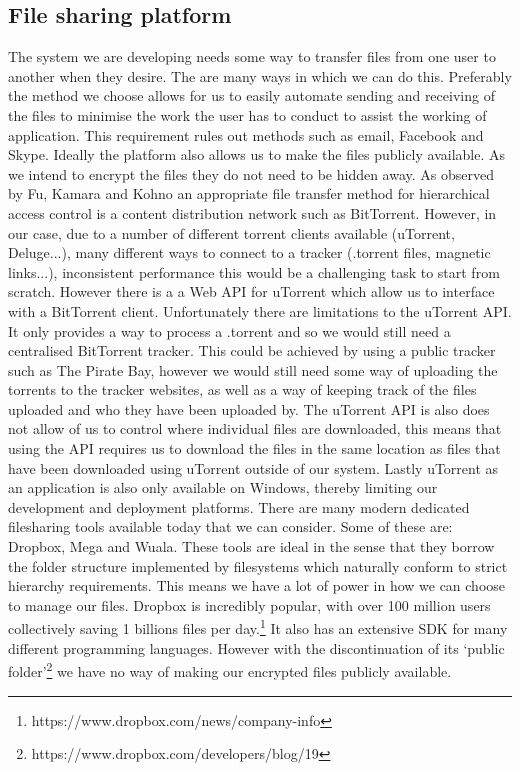 \documentclass[12pt, titlepage]{article}
\begin{document}
\subsection{File sharing platform}
The system we are developing needs some way to transfer files from one user to another when they desire. The are many ways in which we can do this. Preferably the method we choose allows for us to easily automate sending and receiving of the files to minimise the work the user has to conduct to assist the working of application. This requirement rules out methods such as email, Facebook and Skype. Ideally the platform also allows us to make the files publicly available. As we intend to encrypt the files they do not need to be hidden away.
\newline \indent As observed by Fu, Kamara and Kohno an appropriate file transfer method for hierarchical access control is a content distribution network such as BitTorrent.\cite{bittorrent} However, in our case, due to a number of different torrent clients available (uTorrent, Deluge...), many different ways to connect to a tracker (.torrent files, magnetic links...), inconsistent performance this would be a challenging task to start from scratch. However there is a a Web API for uTorrent which allow us to interface with a BitTorrent client.\cite{http://www.utorrent.com/community/developers/webapi} Unfortunately there are limitations to the uTorrent API. It only provides a way to process a .torrent and so we would still need a centralised BitTorrent tracker. This could be achieved by using a public tracker such as The Pirate Bay, however we would still need some way of uploading the torrents to the tracker websites, as well as a way of keeping track of the files uploaded and who they have been uploaded by. The uTorrent API is also does not allow of us to control where individual files are downloaded, this means that using the API requires us to download the files in the same location as files that have been downloaded using uTorrent outside of our system. Lastly uTorrent as an application is also only available on Windows, thereby limiting our development and deployment platforms.
\newline \indent There are many modern dedicated filesharing tools available today that we can consider. Some of these are: Dropbox, Mega and Wuala. These tools are ideal in the sense that they borrow the folder structure implemented by filesystems which naturally conform to strict hierarchy requirements. This means we have a lot of power in how we can choose to manage our files. Dropbox is incredibly popular, with over 100 million users collectively saving 1 billions files per day.\footnote{https://www.dropbox.com/news/company-info} It also has an extensive SDK for many different programming languages. However with the discontinuation of its `public folder'\footnote{https://www.dropbox.com/developers/blog/19} we have no way of making our encrypted files publicly available.
\end{document}
